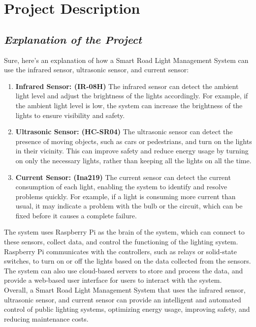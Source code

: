 \documentclass{article}
\begin{document}
\section{\textbf{Project Description}}
\subsection{\textit{Explanation of the Project}}
Sure, here's an explanation of how a Smart Road Light Management System can use the infrared sensor, ultrasonic sensor, and current sensor:
\begin{enumerate}
    \item \textbf{Infrared Sensor: (IR-08H)} The infrared sensor can detect the ambient light level and adjust the brightness of the lights accordingly. For example, if the ambient light level is low, the system can increase the brightness of the lights to ensure visibility and safety.
    \item \textbf{Ultrasonic Sensor: (HC-SR04)} The ultrasonic sensor can detect the presence of moving objects, such as cars or pedestrians, and turn on the lights in their vicinity. This can improve safety and reduce energy usage by turning on only the necessary lights, rather than keeping all the lights on all the time.
    \item \textbf{Current Sensor: (Ina219)} The current sensor can detect the current consumption of each light, enabling the system to identify and resolve problems quickly. For example, if a light is consuming more current than usual, it may indicate a problem with the bulb or the circuit, which can be fixed before it causes a complete failure.
\end{enumerate}
The system uses Raspberry Pi as the brain of the system, which can connect to these sensors, collect data, and control the functioning of the lighting system. Raspberry Pi communicates with the controllers, such as relays or solid-state switches, to turn on or off the lights based on the data collected from the sensors. The system can also use cloud-based servers to store and process the data, and provide a web-based user interface for users to interact with the system.\\

Overall, a Smart Road Light Management System that uses the infrared sensor, ultrasonic sensor, and current sensor can provide an intelligent and automated control of public lighting systems, optimizing energy usage, improving safety, and reducing maintenance costs.
\end{document}
